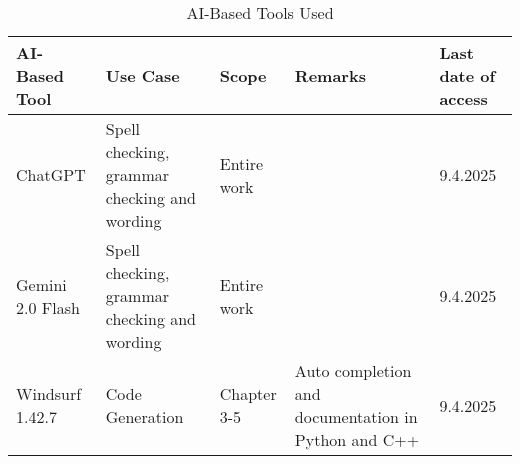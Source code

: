 \begin{table}[htbp]
    \centering
    \caption{AI-Based Tools Used}
    \label{tab:ai_tools}
    \begin{tabular}{p{2cm} p{4cm} p{3cm} p{4cm} p{2cm}}
      \toprule
      \textbf{AI-Based Tool} & \textbf{Use Case} & \textbf{Scope} & \textbf{Remarks} & \textbf{Last date of access}\\
      \midrule
      ChatGPT& Spell checking, grammar checking and wording & Entire work & & 9.4.2025\\
      Gemini 2.0 Flash & Spell checking, grammar checking and wording & Entire work & & 9.4.2025\\
      Windsurf 1.42.7 & Code Generation & Chapter 3-5  & Auto completion and documentation in Python and C++ & 9.4.2025\\
     
      \bottomrule
    \end{tabular}
  \end{table}